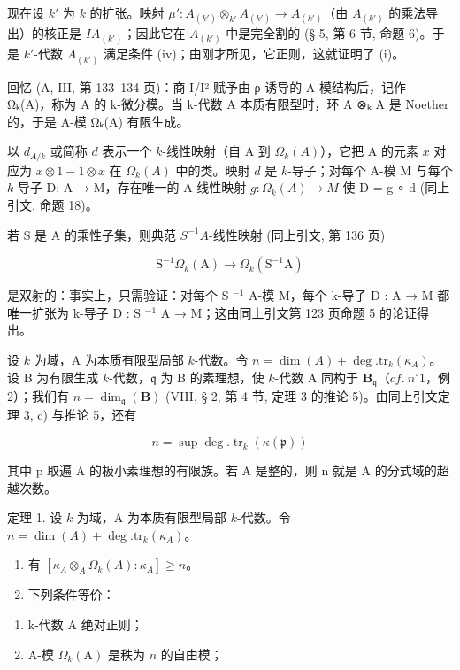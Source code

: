 现在设 \(k'\) 为 \(k\) 的扩张。映射 \(\mu': A_{(k')} \otimes_{k'} A_{(k')} \to A_{(k')}\)（由 \(A_{(k')}\) 的乘法导出）的核正是 \(IA_{(k')}\)；因此它在 \(A_{(k')}\) 中是完全割的 (§ 5, 第 6 节, 命题 6)。于是 \(k'\)-代数 \(A_{(k')}\) 满足条件 (iv)；由刚才所见，它正则，这就证明了 (i)。

回忆 (A, III, 第 133–134 页)：商 I/I² 赋予由 ρ 诱导的 A-模结构后，记作 Ωₖ(A)，称为 A 的 k-微分模。当 k-代数 A 本质有限型时，环 A ⊗ₖ A 是 Noether 的，于是 A-模 Ωₖ(A) 有限生成。

以 \(d_{A/k}\) 或简称 \(d\) 表示一个 \(k\)-线性映射（自 A 到 \(\Omega_k(A)\)），它把 A 的元素 \(x\) 对应为 \(x \otimes 1 - 1 \otimes x\) 在 \(\Omega_k(A)\) 中的类。映射 \(d\) 是 \(k\)-导子；对每个 A-模 M 与每个 \(k\)-导子 D: A → M，存在唯一的 A-线性映射 \(g: \Omega_k(A) \to M\) 使 D = g ∘ d (同上引文, 命题 18)。

若 S 是 A 的乘性子集，则典范 \(S^{-1}A\)-线性映射 (同上引文, 第 136 页)

\[
\mathrm{S} ^ {- 1} \Omega_ {k} (\mathrm{A}) \rightarrow \Omega_ {k} (\mathrm{S} ^ {- 1} \mathrm{A})
\]

是双射的：事实上，只需验证：对每个 S \(^{-1}\) A-模 M，每个 k-导子 D : A → M 都唯一扩张为 k-导子 D : S \(^{-1}\) A → M；这由同上引文第 123 页命题 5 的论证得出。

设 \(k\) 为域，A 为本质有限型局部 \(k\)-代数。令 \(n = \dim(A) + \deg.\mathrm{tr}_k(\kappa_A)\)。设 B 为有限生成 \(k\)-代数，\(\mathfrak{q}\) 为 B 的素理想，使 \(k\)-代数 A 同构于 \(\mathbf{B}_{\mathfrak{q}}\)（\(cf.\ n^{\circ} 1\)，例 2）；我们有 \(n = \dim_{\mathfrak{q}}(\mathbf{B})\) (VIII, § 2, 第 4 节, 定理 3 的推论 5)。由同上引文定理 3, c) 与推论 5，还有

\[
n = \sup \deg . \operatorname{tr} _ {k} (\kappa (\mathfrak {p}))
\]

其中 p 取遍 A 的极小素理想的有限族。若 A 是整的，则 n 就是 A 的分式域的超越次数。

定理 1. 设 \(k\) 为域，A 为本质有限型局部 \(k\)-代数。令 \(n = \dim(A) + \deg.\mathrm{tr}_{k}(\kappa_{A})\)。

\begin{enumerate}
\def\labelenumi{\alph{enumi})}
\item
  有 \([\kappa_{A} \otimes_{A} \Omega_k(A): \kappa_{A}] \geqslant n\)。
\item
  下列条件等价：
\end{enumerate}

\begin{enumerate}
\def\labelenumi{(\roman{enumi})}
\item
  k-代数 A 绝对正则；
\item
  A-模 \(\Omega_{k}(\mathrm{A})\) 是秩为 \(n\) 的自由模；
\end{enumerate}

